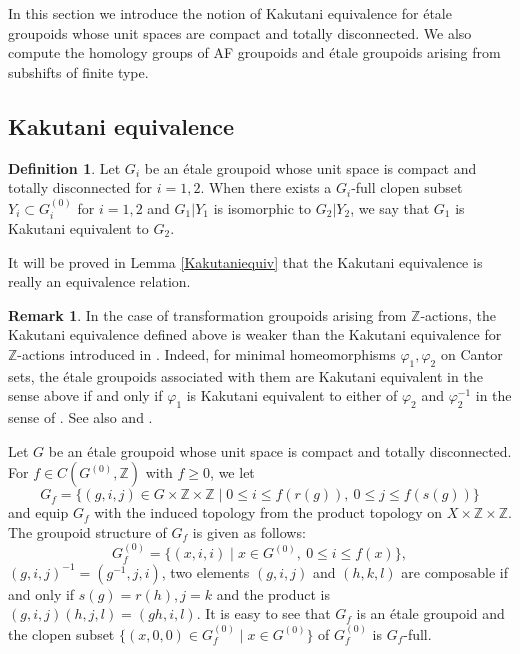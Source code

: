 \documentclass[11pt]{article}
\theoremstyle{definition}
\newtheorem{df}[thm]{Definition}
\newtheorem{rem}[thm]{Remark}
\renewcommand{\phi}{\varphi}
\newcommand{\Z}{\mathbb{Z}}
\begin{document}
In this section we introduce the notion of Kakutani equivalence 
for \'etale groupoids whose unit spaces are compact and totally disconnected. 
We also compute the homology groups of AF groupoids and 
\'etale groupoids arising from subshifts of finite type. 


\subsection{Kakutani equivalence}

\begin{df}
Let $G_i$ be an \'etale groupoid 
whose unit space is compact and totally disconnected for $i=1,2$. 
When there exists a $G_i$-full clopen subset $Y_i\subset G_i^{(0)}$ 
for $i=1,2$ and $G_1|Y_1$ is isomorphic to $G_2|Y_2$, 
we say that $G_1$ is Kakutani equivalent to $G_2$. 
\end{df}

It will be proved in Lemma \ref{Kakutaniequiv} that 
the Kakutani equivalence is really an equivalence relation. 

\begin{rem}
In the case of transformation groupoids arising from $\Z$-actions, 
the Kakutani equivalence defined above is weaker 
than the Kakutani equivalence for $\Z$-actions introduced 
in \cite{GPS1}. 
Indeed, 
for minimal homeomorphisms $\phi_1,\phi_2$ on Cantor sets, 
the \'etale groupoids associated with them are 
Kakutani equivalent in the sense above if and only if 
$\phi_1$ is Kakutani equivalent to either of $\phi_2$ and $\phi_2^{-1}$ 
in the sense of \cite[Definition 1.7]{GPS1}. 
See also \cite[Theorem 2.4]{GPS1} and \cite{BT}. 
\end{rem}

Let $G$ be an \'etale groupoid 
whose unit space is compact and totally disconnected. 
For $f\in C(G^{(0)},\Z)$ with $f\geq0$, we let 
\[
G_f=\{(g,i,j)\in G\times\Z\times\Z\mid
0\leq i\leq f(r(g)),\ 0\leq j\leq f(s(g))\}
\]
and equip $G_f$ with the induced topology 
from the product topology on $X\times\Z\times\Z$. 
The groupoid structure of $G_f$ is given as follows: 
\[
G_f^{(0)}=\{(x,i,i)\mid x\in G^{(0)}, \ 0\leq i\leq f(x)\}, 
\]
$(g,i,j)^{-1}=(g^{-1},j,i)$, 
two elements $(g,i,j)$ and $(h,k,l)$ are composable 
if and only if $s(g)=r(h),j=k$ and 
the product is $(g,i,j)(h,j,l)=(gh,i,l)$. 
It is easy to see that 
$G_f$ is an \'etale groupoid and 
the clopen subset $\{(x,0,0)\in G_f^{(0)}\mid x\in G^{(0)}\}$ 
of $G_f^{(0)}$ is $G_f$-full. 
\end{document}
